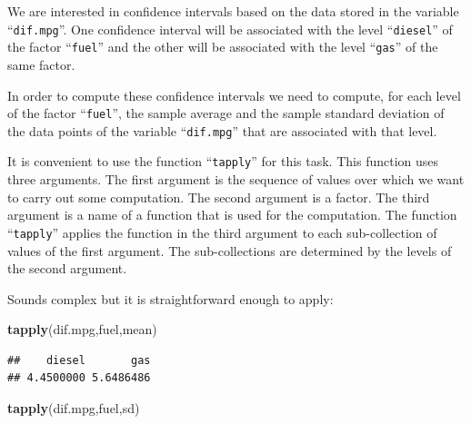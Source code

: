 \documentclass[]{krantz}
\makeatletter
\newenvironment{Shaded}{\begin{snugshade}}{\end{snugshade}}
\newcommand{\KeywordTok}[1]{\textcolor[rgb]{0.13,0.29,0.53}{\textbf{#1}}}
\newcommand{\NormalTok}[1]{#1}
\newcommand{\OperatorTok}[1]{\textcolor[rgb]{0.81,0.36,0.00}{\textbf{#1}}}
\newcommand{\StringTok}[1]{\textcolor[rgb]{0.31,0.60,0.02}{#1}}
\newenvironment{kframe}{%
\medskip{}
\setlength{\fboxsep}{.8em}
 \def\at@end@of@kframe{}%
 \ifinner\ifhmode%
  \def\at@end@of@kframe{\end{minipage}}%
  \begin{minipage}{\columnwidth}%
 \fi\fi%
 \def\FrameCommand##1{\hskip\@totalleftmargin \hskip-\fboxsep
 \colorbox{shadecolor}{##1}\hskip-\fboxsep
     \hskip-\linewidth \hskip-\@totalleftmargin \hskip\columnwidth}%
 \MakeFramed {\advance\hsize-\width
   \@totalleftmargin\z@ \linewidth\hsize
   \@setminipage}}%
 {\par\unskip\endMakeFramed%
 \at@end@of@kframe}
\renewenvironment{Shaded}{\begin{kframe}}{\end{kframe}}
\theoremstyle{definition}
\theoremstyle{definition}
\theoremstyle{definition}
\theoremstyle{remark}
\makeatother
\begin{document}
\begin{Shaded}
\end{Shaded}

We are interested in confidence intervals based on the data stored in
the variable ``\texttt{dif.mpg}''. One confidence interval will be associated
with the level ``\texttt{diesel}'' of the factor ``\texttt{fuel}'' and the other will be
associated with the level ``\texttt{gas}'' of the same factor.

In order to compute these confidence intervals we need to compute, for
each level of the factor ``\texttt{fuel}'', the sample average and the sample
standard deviation of the data points of the variable ``\texttt{dif.mpg}'' that
are associated with that level.

It is convenient to use the function ``\texttt{tapply}'' for this task. This
function uses three arguments. The first argument is the sequence of
values over which we want to carry out some computation. The second
argument is a factor. The third argument is a name of a function that is
used for the computation. The function ``\texttt{tapply}'' applies the function
in the third argument to each sub-collection of values of the first
argument. The sub-collections are determined by the levels of the second
argument.

Sounds complex but it is straightforward enough to apply:

\begin{Shaded}
\begin{Highlighting}[]
\KeywordTok{tapply}\NormalTok{(dif.mpg,fuel,mean)}
\end{Highlighting}
\end{Shaded}

\begin{verbatim}
##    diesel       gas 
## 4.4500000 5.6486486
\end{verbatim}

\begin{Shaded}
\begin{Highlighting}[]
\KeywordTok{tapply}\NormalTok{(dif.mpg,fuel,sd)}
\end{Highlighting}
\end{Shaded}
\end{document}
